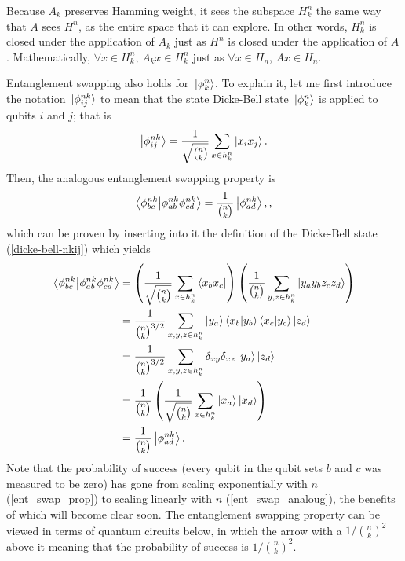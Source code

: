 \documentclass[Dual]{msu-thesis}
\begin{document}
Because $A_k$ preserves Hamming weight, it sees the subspace $H^n_k$ the same way that $A$ sees $H^n$, as the entire space that it can explore. In other words, $H^n_k$ is closed under the application of $A_k$ just as $H^n$ is closed under the application of $A$. Mathematically, $\forall x\in H^n_k$, $A_kx\in H^n_k$ just as $\forall x\in H_n$, $Ax\in H_n$. 

Entanglement swapping also holds for $\ket*{\phi^n_k}$. To explain it, let me first introduce the notation $\ket*{\phi^{nk}_{ij}}$ to mean that the state Dicke-Bell state $\ket*{\phi^n_k}$ is applied to qubits $i$ and $j$; that is
\begin{align}
\label{dicke-bell-nkij}
\ket{\phi^{nk}_{ij}} = \frac{1}{\sqrt{{n \choose k}}}\sum_{x \in h^n_k}\ket{x_ix_j}.
\end{align}
Then, the analogous entanglement swapping property is
\begin{align}
\label{ent_swap_analoug}
\bra{\phi^{nk}_{bc}}\ket{\phi^{nk}_{ab}\phi^{nk}_{cd}}
=
\frac{1}{{n \choose k}}\ket{\phi^{nk}_{ad}},
,\end{align}
which can be proven by inserting into it the definition of the Dicke-Bell state (\ref{dicke-bell-nkij}) which yields
\begin{align}
\bra{\phi^{nk}_{bc}}\ket{\phi^{nk}_{ab}\phi^{nk}_{cd}}
&=
\left(
\frac{1}{\sqrt{{n \choose k}}}
\sum_{x\in h^n_k}\bra{x_bx_c}
\right)
\left(
\frac{1}{{n \choose k}}
\sum_{y,z\in h^n_k}\ket{y_ay_bz_cz_d}
\right)
\\
&=
\frac{1}{{n \choose k}^{3/2}}
\sum_{x,y,z\in h^n_k}\ket{y_a}\bra{x_b}\ket{y_b}\bra{x_c}\ket{y_c}\ket{z_d}
\\
&=
\frac{1}{{n \choose k}^{3/2}}
\sum_{x,y,z\in h^n_k}\delta_{xy}\delta_{xz}\ket{y_a}\ket{z_d}
\\
&=
\frac{1}{{n \choose k}}
\left(
\frac{1}{\sqrt{{n \choose k}}}
\sum_{x\in h^n_k}\ket{x_a}\ket{x_d}
\right)
\\
&=
\frac{1}{{n \choose k}}\ket{\phi^{nk}_{ad}}
.\end{align}
Note that the probability of success (every qubit in the qubit sets $b$ and $c$ was measured to be zero) has gone from scaling exponentially with $n$ (\ref{ent_swap_prop}) to scaling linearly with $n$ (\ref{ent_swap_analoug}), the benefits of which will become clear soon. The entanglement swapping property can be viewed in terms of quantum circuits below, in which the arrow with a $1/{n \choose k}^2$ above it meaning that the probability of success is $1/{n \choose k}^2$.
\end{document}
